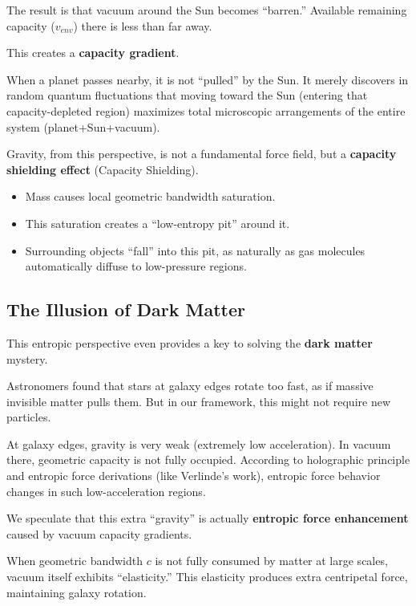 The result is that vacuum around the Sun becomes ``barren.'' Available remaining capacity ($v_{env}$) there is less than far away.

This creates a \textbf{capacity gradient}.

When a planet passes nearby, it is not ``pulled'' by the Sun. It merely discovers in random quantum fluctuations that moving toward the Sun (entering that capacity-depleted region) maximizes total microscopic arrangements of the entire system (planet+Sun+vacuum).

Gravity, from this perspective, is not a fundamental force field, but a \textbf{capacity shielding effect} (Capacity Shielding).

\begin{itemize}
\item Mass causes local geometric bandwidth saturation.

\item This saturation creates a ``low-entropy pit'' around it.

\item Surrounding objects ``fall'' into this pit, as naturally as gas molecules automatically diffuse to low-pressure regions.
\end{itemize}

\subsection{The Illusion of Dark Matter}

This entropic perspective even provides a key to solving the \textbf{dark matter} mystery.

Astronomers found that stars at galaxy edges rotate too fast, as if massive invisible matter pulls them. But in our framework, this might not require new particles.

At galaxy edges, gravity is very weak (extremely low acceleration). In vacuum there, geometric capacity is not fully occupied. According to holographic principle and entropic force derivations (like Verlinde's work), entropic force behavior changes in such low-acceleration regions.

We speculate that this extra ``gravity'' is actually \textbf{entropic force enhancement} caused by vacuum capacity gradients.

When geometric bandwidth $c$ is not fully consumed by matter at large scales, vacuum itself exhibits ``elasticity.'' This elasticity produces extra centripetal force, maintaining galaxy rotation.

